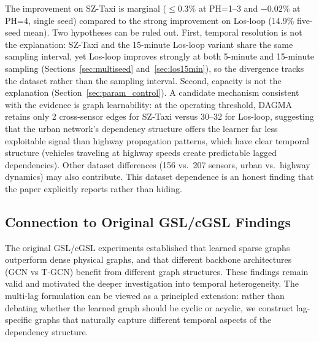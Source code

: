 The improvement on SZ-Taxi is marginal ($\leq0.3\%$ at PH=1--3 and $-0.02\%$ at PH=4, single seed) compared to the strong improvement on Los-loop (14.9\% five-seed mean). Two hypotheses can be ruled out. First, temporal resolution is not the explanation: SZ-Taxi and the 15-minute Los-loop variant share the same sampling interval, yet Los-loop improves strongly at both 5-minute and 15-minute sampling (Sections~\ref{sec:multiseed} and~\ref{sec:los15min}), so the divergence tracks the dataset rather than the sampling interval. Second, capacity is not the explanation (Section~\ref{sec:param_control}). A candidate mechanism consistent with the evidence is graph learnability: at the operating threshold, DAGMA retains only 2 cross-sensor edges for SZ-Taxi versus 30--32 for Los-loop, suggesting that the urban network's dependency structure offers the learner far less exploitable signal than highway propagation patterns, which have clear temporal structure (vehicles traveling at highway speeds create predictable lagged dependencies). Other dataset differences (156 vs.\ 207 sensors, urban vs.\ highway dynamics) may also contribute. This dataset dependence is an honest finding that the paper explicitly reports rather than hiding.

\subsection{Connection to Original GSL/cGSL Findings}

The original GSL/cGSL experiments established that learned sparse graphs outperform dense physical graphs, and that different backbone architectures (GCN vs T-GCN) benefit from different graph structures. These findings remain valid and motivated the deeper investigation into temporal heterogeneity. The multi-lag formulation can be viewed as a principled extension: rather than debating whether the learned graph should be cyclic or acyclic, we construct lag-specific graphs that naturally capture different temporal aspects of the dependency structure.


